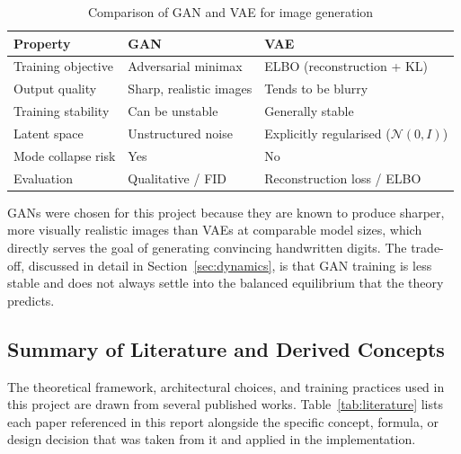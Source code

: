 \documentclass[12pt,a4paper]{article}
\begin{document}
\begin{table}[H]
    \begin{center}
        \begin{tabular}{|l|l|l|}
            \hline
            \textbf{Property} & \textbf{GAN} & \textbf{VAE} \\
            \hline
            Training objective & Adversarial minimax & ELBO (reconstruction + KL) \\
            \hline
            Output quality & Sharp, realistic images & Tends to be blurry \\
            \hline
            Training stability & Can be unstable & Generally stable \\
            \hline
            Latent space & Unstructured noise & Explicitly regularised ($\mathcal{N}(0,I)$) \\
            \hline
            Mode collapse risk & Yes & No \\
            \hline
            Evaluation & Qualitative / FID & Reconstruction loss / ELBO \\
            \hline
        \end{tabular}
        \caption{Comparison of GAN and VAE for image generation}
        \label{tab:ganvsvae}
    \end{center}
\end{table}

GANs were chosen for this project because they are known to produce sharper, more
visually realistic images than VAEs at comparable model sizes, which directly serves the
goal of generating convincing handwritten digits. The trade-off, discussed in detail in
Section~\ref{sec:dynamics}, is that GAN training is less stable and does not always
settle into the balanced equilibrium that the theory predicts.

\subsection{Summary of Literature and Derived Concepts}

The theoretical framework, architectural choices, and training practices used in this
project are drawn from several published works. Table~\ref{tab:literature} lists each
paper referenced in this report alongside the specific concept, formula, or design
decision that was taken from it and applied in the implementation.
\end{document}
